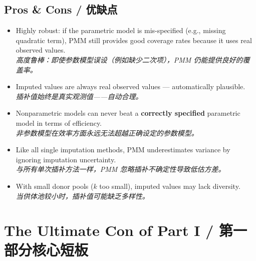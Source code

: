 \documentclass[9pt, a4paper]{article}
\begin{document}
\subsection{Pros \& Cons / 优缺点}
\begin{tcolorbox}[prosbox]
    \begin{itemize}
        \item [\ding{51}] Highly robust: if the parametric model is mis-specified (e.g., missing quadratic term), PMM still provides good coverage rates because it uses real observed values.\\
        \textit{高度鲁棒：即使参数模型误设（例如缺少二次项），PMM 仍能提供良好的覆盖率。}
        \item [\ding{51}] Imputed values are always real observed values — automatically plausible.\\
        \textit{插补值始终是真实观测值——自动合理。}
    \end{itemize}
\end{tcolorbox}
\begin{tcolorbox}[consbox]
    \begin{itemize}
        \item [\ding{55}] Nonparametric models can never beat a \textbf{correctly specified} parametric model in terms of efficiency.\\
        \textit{非参数模型在效率方面永远无法超越正确设定的参数模型。}
        \item [\ding{55}] Like all single imputation methods, PMM underestimates variance by ignoring imputation uncertainty.\\
        \textit{与所有单次插补方法一样，PMM 忽略插补不确定性导致低估方差。}
        \item [\ding{55}] With small donor pools ($k$ too small), imputed values may lack diversity.\\
        \textit{当供体池较小时，插补值可能缺乏多样性。}
    \end{itemize}
\end{tcolorbox}

\section{The Ultimate Con of Part I / 第一部分核心短板}
\end{document}
